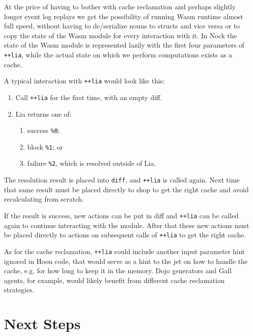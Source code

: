 \documentclass[twoside]{article}
\begin{document}
At the price of having to bother with cache reclamation and perhaps slightly longer event log replays we get the possibility of running Wasm runtime almost full speed, without having to de/serialize nouns to structs and vice versa or to copy the state of the Wasm module for every interaction with it. In Nock the state of the Wasm module is represented lazily with the first four parameters of \lstinline[style=inlinecode]{++lia}, while the actual state on which we perform computations exists as a cache.

A typical interaction with \lstinline[style=inlinecode]{++lia} would look like this:

\begin{enumerate}
  \item  Call \lstinline[style=inlinecode]{++lia} for the first time, with an empty diff.
  \item  Lia returns one of:
  \begin{enumerate}
    \item  success \lstinline[style=inlinecode]{%0};
    \item  block \lstinline[style=inlinecode]{%1}; or
    \item  failure \lstinline[style=inlinecode]{%2}, which is resolved outside of Lia.
  \end{enumerate}
\end{enumerate}

\noindent
The resolution result is placed into \lstinline[style=inlinecode]{diff}, and \lstinline[style=inlinecode]{++lia} is called again. Next time that same result must be placed directly to shop to get the right cache and avoid recalculating from scratch.

If the result is success, new actions can be put in diff and \lstinline[style=inlinecode]{++lia} can be called again to continue interacting with the module. After that these new actions must be placed directly to actions on subsequent calls of \lstinline[style=inlinecode]{++lia} to get the right cache.

As for the cache reclamation, \lstinline[style=inlinecode]{++lia} could include another input parameter hint ignored in Hoon code, that would serve as a hint to the jet on how to handle the cache, e.g. for how long to keep it in the memory. Dojo generators and Gall agents, for example, would likely benefit from different cache reclamation strategies.


\section{Next Steps}
\end{document}
